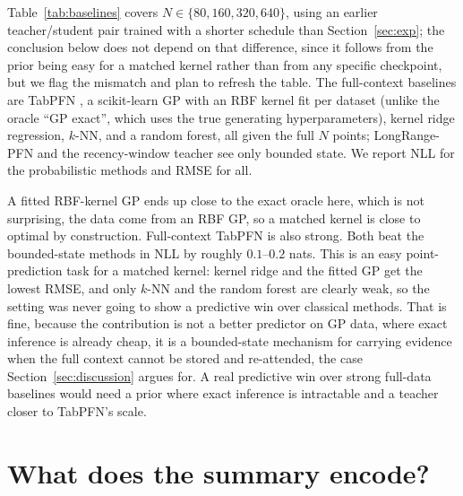 \documentclass{article}
\begin{document}
Table~\ref{tab:baselines} covers $N \in \{80, 160, 320, 640\}$, using an
earlier teacher/student pair trained with a shorter schedule than
Section~\ref{sec:exp}; the conclusion below does not depend on that
difference, since it follows from the prior being easy for a matched
kernel rather than from any specific checkpoint, but we flag the mismatch
and plan to refresh the table. The full-context baselines are TabPFN
\citep{hollmann2025tabpfn}, a scikit-learn GP with an RBF kernel fit per
dataset (unlike the oracle ``GP exact'', which uses the true generating
hyperparameters), kernel ridge regression, $k$-NN, and a random forest, all
given the full $N$ points; LongRange-PFN and the recency-window teacher see
only bounded state. We report NLL for the probabilistic methods and RMSE
for all.

A fitted RBF-kernel GP ends up close to the exact oracle here, which is
not surprising, the data come from an RBF GP, so a matched kernel is
close to optimal by construction. Full-context TabPFN is also strong. Both
beat the bounded-state methods in NLL by roughly $0.1$--$0.2$ nats. This is
an easy point-prediction task for a matched kernel: kernel ridge and the
fitted GP get the lowest RMSE, and only $k$-NN and the random forest are
clearly weak, so the setting was never going to show a predictive win over
classical methods. That is fine, because the contribution is not a better
predictor on GP data, where exact inference is already cheap, it is a
bounded-state mechanism for carrying evidence when the full context cannot
be stored and re-attended, the case Section~\ref{sec:discussion} argues
for. A real predictive win over strong full-data baselines would need a
prior where exact inference is intractable and a teacher closer to
TabPFN's scale.

\begin{table}[H]
\centering
\caption{Large-context defensive baselines over total context size $N$
(up to $8\times$ the teacher's window; $100$ datasets per cell, TabPFN on
its own smaller sample, noted in text). \emph{Full-context} baselines see
all $N$ points; \emph{bounded-state} methods (teacher-window, LongRange-PFN)
see only recent points plus, for LongRange-PFN, the $O(k)$ recursive
summary. NLL (nats) for probabilistic methods, RMSE for all; mean $\pm$
s.e.}
\label{tab:baselines}
\resizebox{\textwidth}{!}{}
\end{table}

\section{What does the summary encode?}
\label{app:probe}
\end{document}
